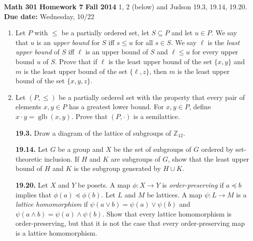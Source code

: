 \documentclass[12pt,reqno]{amsart}
\newcommand{\boldemph}{\emph}
\newcommand{\probskip}{\vskip1cm}
\begin{document}
\thispagestyle{empty}

\noindent \textbf{Math 301} \hskip5cm {\bf Homework 7} \hfill {\bf Fall 2014}
\vskip1cm
 1, 2 (below) and Judson 19.3, 19.14, 19.20.\\
{\bf Due date:} Wednesday, 10/22

\bigskip

\begin{enumerate}[{\bf 1.}]

\item %
Let $P$ with $\leq$ be a partially ordered set, let $S \subseteq P$ and let
$u\in P$.  We say that $u$ is an \emph{upper bound} for $S$ iff $s\leq u$ for
all $s \in S$.  We say $\ell$ is the \emph{least upper bound} of $S$ iff $\ell$
is an upper bound of $S$ and $\ell \leq u$ for every upper bound $u$ of $S$.
Prove that if $\ell$ is the least upper bound of the set $\{x, y\}$ and $m$ is
the least upper bound of the set $\{\ell, z\}$, then $m$ is the least upper
bound of the set $\{x, y, z\}$.

\probskip

\item
Let $(P, \leq)$ be a partially ordered set with the property that every pair of
elements $x, y \in P$ has a greatest lower bound. For $x, y\in P$, define 
$x \cdot y = \operatorname{glb}(x,y)$. Prove that $(P, \cdot)$ is a semilattice.


\probskip
 
\item[{\bf 19.3.}] 
Draw a diagram of the lattice of subgroups of ${\mathbb Z}_{12}$.
 
 
\probskip

\item[{\bf 19.14.}] 
Let $G$ be a group and $X$ be the set of subgroups of $G$ ordered by
set-theoretic inclusion. If $H$ and $K$ are subgroups of $G$, show
that the least upper bound of $H$ and $K$ is the subgroup generated by
$H \cup K$. 
 
\probskip
 
\item[{\bf 19.20.}] 
Let $X$ and $Y$ be posets.  A map $\phi : X \rightarrow Y$ is \boldemph{
order-preserving} if $a \preceq b$
implies that $\phi(a) \preceq \phi(b)$.  Let $L$ and $M$ be lattices.
A map $\psi: L \rightarrow M$ is a \boldemph{lattice
homomorphism}
if $\psi( a \vee b ) = \psi(a) \vee \psi(b)$ and $\psi( a \wedge b ) =
\psi(a) \wedge \psi(b)$. Show that every lattice homomorphism is
order-preserving, but that it is not the case that every
order-preserving map is a lattice homomorphism.  
 
 
 
\end{enumerate}
\end{document}
